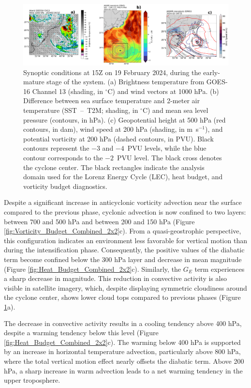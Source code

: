 \documentclass[pdflatex,sn-chicago]{sn-jnl}%
\theoremstyle{plain}
\theoremstyle{definition}
\theoremstyle{remark}
\theoremstyle{definition}
\begin{document}
\begin{figure}[h!]
\centering
\includegraphics[width=\textwidth]{composition_05.png}
\caption{Synoptic conditions at 15Z on 19 February 2024, during the early-mature stage of the system. (a) Brightness temperature from GOES-16 Channel 13 (shading, in $^{\circ}$C) and wind vectors at 1000 hPa. (b) Difference between sea surface temperature and 2-meter air temperature (SST~--~T2M; shading, in $^{\circ}$C) and mean sea level pressure (contours, in hPa). (c) Geopotential height at 500 hPa (red contours, in dam), wind speed at 200 hPa (shading, in m~s$^{-1}$), and potential vorticity at 200 hPa (dashed contours, in PVU). Black contours represent the $-3$ and $-4$~PVU levels, while the blue contour corresponds to the $-2$~PVU level. The black cross denotes the cyclone center. The black rectangles indicate the analysis domain used for the Lorenz Energy Cycle (LEC), heat budget, and vorticity budget diagnostics.}
\label{fig:composition_05}
\end{figure}

Despite a significant increase in anticyclonic vorticity advection near the surface compared to the previous phase, cyclonic advection is now confined to two layers: between 700 and 500 hPa and between 200 and 150 hPa (Figure \ref{fig:Vorticity_Budget_Combined_2x2}c). From a quasi-geostrophic perspective, this configuration indicates an environment less favorable for vertical motion than during the intensification phase. Consequently, the positive values of the diabatic term become confined below the 300 hPa layer and decrease in mean magnitude (Figure \ref{fig:Heat_Budget_Combined_2x2}c). Similarly, the $G_E$ term experiences a sharp decrease in magnitude. This reduction in convective activity is also visible in satellite imagery, which, despite displaying symmetric cloudiness around the cyclone center, shows lower cloud tops compared to previous phases (Figure \ref{fig:composition_05}a).

The decrease in convective activity results in a cooling tendency above 400 hPa, despite a warming tendency below this level (Figure \ref{fig:Heat_Budget_Combined_2x2}c). The warming below 400 hPa is supported by an increase in horizontal temperature advection, particularly above 800 hPa, where the total vertical motion effect nearly offsets the diabatic term. Above 200 hPa, a sharp increase in warm advection leads to a net warming tendency in the upper troposphere. 
\end{document}
